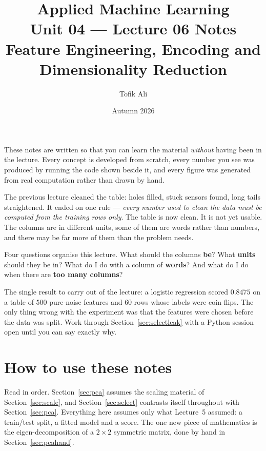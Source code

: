 \documentclass[11pt]{article}
\title{Applied Machine Learning\\Unit 04 --- Lecture 06 Notes\\
       Feature Engineering, Encoding and Dimensionality Reduction}
\author{Tofik Ali}
\date{Autumn 2026}
\begin{document}
\maketitle

\begin{keyidea}
These notes are written so that you can learn the material \emph{without}
having been in the lecture. Every concept is developed from scratch, every
number you see was produced by running the code shown beside it, and every
figure was generated from real computation rather than drawn by hand.

The previous lecture cleaned the table: holes filled, stuck sensors found,
long tails straightened. It ended on one rule --- \emph{every number used to
clean the data must be computed from the training rows only}. The table is now
clean. It is not yet usable. The columns are in different units, some of them
are words rather than numbers, and there may be far more of them than the
problem needs.

Four questions organise this lecture. What should the columns \textbf{be}?
What \textbf{units} should they be in? What do I do with a column of
\textbf{words}? And what do I do when there are \textbf{too many columns}?

The single result to carry out of the lecture: a logistic regression scored
$\mathbf{0.8475}$ on a table of $500$ pure-noise features and $60$ rows whose
labels were coin flips. The only thing wrong with the experiment was that the
features were chosen before the data was split. Work through
Section~\ref{sec:selectleak} with a Python session open until you can say
exactly why.
\end{keyidea}

\tableofcontents
\medskip

\section{How to use these notes}
\label{sec:how}

Read in order. Section~\ref{sec:pca} assumes the scaling material of
Section~\ref{sec:scale}, and Section~\ref{sec:select} contrasts itself
throughout with Section~\ref{sec:pca}. Everything here assumes only what
Lecture~5 assumed: a train/test split, a fitted model and a score. The one new
piece of mathematics is the eigen-decomposition of a $2\times2$ symmetric
matrix, done by hand in Section~\ref{sec:pcahand}.
\end{document}
